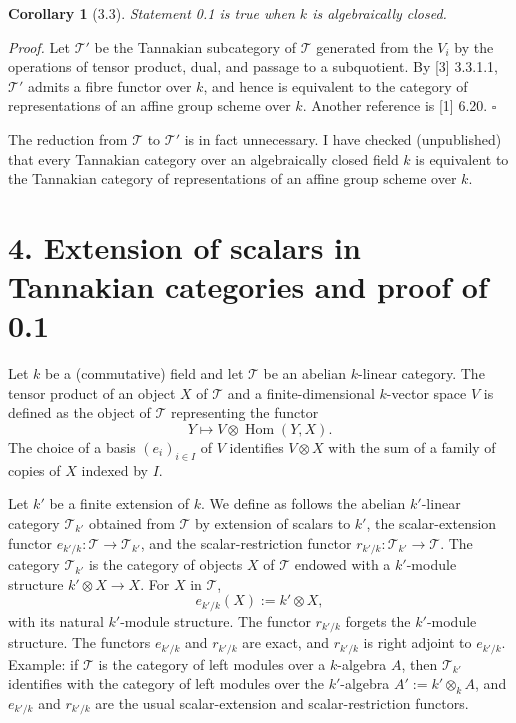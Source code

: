 \documentclass[10pt]{article}
\newcommand{\Hom}{\operatorname{Hom}}
\newcommand{\T}{\mathcal T}
\theoremstyle{deligne}
\newtheorem*{corollary*}{Corollary}
\newenvironment{proofdel}{\textit{Proof.}}{\hfill$\square$}
\newcommand{\heading}[1]{\vspace{0.7em}\noindent{\bfseries #1}\quad}
\begin{document}
\begin{corollary*}[3.3]
Statement 0.1 is true when \(k\) is algebraically closed.
\end{corollary*}

\begin{proofdel}
Let \(\T'\) be the Tannakian subcategory of \(\T\) generated from the \(V_i\) by the operations of tensor product, dual, and passage to a subquotient. By [3] 3.3.1.1, \(\T'\) admits a fibre functor over \(k\), and hence is equivalent to the category of representations of an affine group scheme over \(k\). Another reference is [1] 6.20.
\end{proofdel}

\heading{Remark 3.4.}
The reduction from \(\T\) to \(\T'\) is in fact unnecessary. I have checked (unpublished) that every Tannakian category over an algebraically closed field \(k\) is equivalent to the Tannakian category of representations of an affine group scheme over \(k\).

\section*{4. Extension of scalars in Tannakian categories and proof of 0.1}

\heading{4.1.}
Let \(k\) be a (commutative) field and let \(\T\) be an abelian \(k\)-linear category. The tensor product of an object \(X\) of \(\T\) and a finite-dimensional \(k\)-vector space \(V\) is defined as the object of \(\T\) representing the functor
\[
Y\longmapsto V\otimes \Hom(Y,X).
\]
The choice of a basis \((e_i)_{i\in I}\) of \(V\) identifies \(V\otimes X\) with the sum of a family of copies of \(X\) indexed by \(I\).

Let \(k'\) be a finite extension of \(k\). We define as follows the abelian \(k'\)-linear category \(\T_{k'}\) obtained from \(\T\) by extension of scalars to \(k'\), the scalar-extension functor \(e_{k'/k}:\T\to\T_{k'}\), and the scalar-restriction functor \(r_{k'/k}:\T_{k'}\to\T\). The category \(\T_{k'}\) is the category of objects \(X\) of \(\T\) endowed with a \(k'\)-module structure \(k'\otimes X\to X\). For \(X\) in \(\T\),
\[
e_{k'/k}(X):=k'\otimes X,
\]
with its natural \(k'\)-module structure. The functor \(r_{k'/k}\) forgets the \(k'\)-module structure. The functors \(e_{k'/k}\) and \(r_{k'/k}\) are exact, and \(r_{k'/k}\) is right adjoint to \(e_{k'/k}\). Example: if \(\T\) is the category of left modules over a \(k\)-algebra \(A\), then \(\T_{k'}\) identifies with the category of left modules over the \(k'\)-algebra \(A':=k'\otimes_k A\), and \(e_{k'/k}\) and \(r_{k'/k}\) are the usual scalar-extension and scalar-restriction functors.
\end{document}
